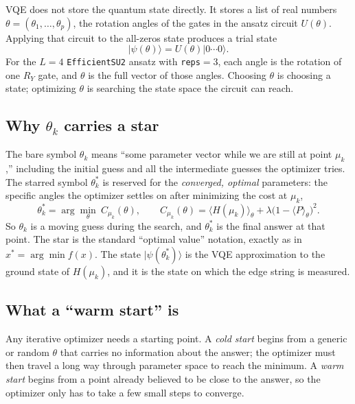 \documentclass[11pt]{article}
\newcommand{\ket}[1]{|#1\rangle}
\begin{document}
VQE does not store the quantum state directly. It stores a list of real numbers $\theta=(\theta_1,\dots,\theta_p)$, the rotation angles of the gates in the ansatz circuit $U(\theta)$. Applying that circuit to the all-zeros state produces a trial state
\begin{equation}
  \ket{\psi(\theta)} = U(\theta)\ket{0\cdots 0}.
\end{equation}
For the $L=4$ \texttt{EfficientSU2} ansatz with \texttt{reps}$=3$, each angle is the rotation of one $R_Y$ gate, and $\theta$ is the full vector of those angles. Choosing $\theta$ is choosing a state; optimizing $\theta$ is searching the state space the circuit can reach.

\subsection*{Why $\theta_k$ carries a star}

The bare symbol $\theta_k$ means ``some parameter vector while we are still at point $\mu_k$,'' including the initial guess and all the intermediate guesses the optimizer tries. The starred symbol $\theta_k^{*}$ is reserved for the \emph{converged, optimal} parameters: the specific angles the optimizer settles on after minimizing the cost at $\mu_k$,
\begin{equation}
  \theta_k^{*} = \arg\min_{\theta}\ C_{\mu_k}(\theta),
  \qquad
  C_{\mu_k}(\theta) = \langle H(\mu_k)\rangle_\theta + \lambda\bigl(1-\langle P\rangle_\theta\bigr)^2.
\end{equation}
So $\theta_k$ is a moving guess during the search, and $\theta_k^{*}$ is the final answer at that point. The star is the standard ``optimal value'' notation, exactly as in $x^{*}=\arg\min f(x)$. The state $\ket{\psi(\theta_k^{*})}$ is the VQE approximation to the ground state of $H(\mu_k)$, and it is the state on which the edge string is measured.

\subsection*{What a ``warm start'' is}

Any iterative optimizer needs a starting point. A \emph{cold start} begins from a generic or random $\theta$ that carries no information about the answer; the optimizer must then travel a long way through parameter space to reach the minimum. A \emph{warm start} begins from a point already believed to be close to the answer, so the optimizer only has to take a few small steps to converge.
\end{document}
